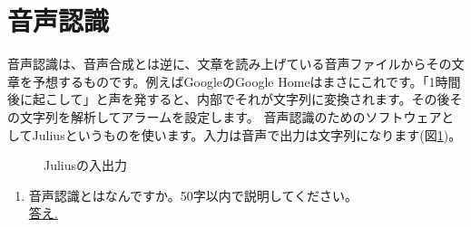 \section{音声認識}
音声認識は、音声合成とは逆に、文章を読み上げている音声ファイルからその文章を予想するものです。例えばGoogleのGoogle Homeはまさにこれです。「1時間後に起こして」と声を発すると、内部でそれが文字列に変換されます。その後その文字列を解析してアラームを設定します。
音声認識のためのソフトウェアとしてJuliusというものを使います。入力は音声で出力は文字列になります(図\ref{Juliusの入出力})。

\begin{figure}[H]
\begin{center}
    
    \caption{Juliusの入出力}
    \label{Juliusの入出力}
\end{center}
\end{figure}

\begin{tcolorbox}[title=\useOmetoi]
\begin{enumerate}
\item 音声認識とはなんですか。50字以内で説明してください。\\
\underline{答え.\hspace{0.8\linewidth}}
\end{enumerate}
\end{tcolorbox}
